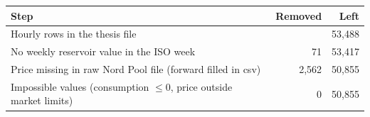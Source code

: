 \begin{tabular}{lrr}
\toprule
Step & Removed & Left \\
\midrule
Hourly rows in the thesis file &  & 53{,}488 \\
No weekly reservoir value in the ISO week & 71 & 53{,}417 \\
Price missing in raw Nord Pool file (forward filled in csv) & 2{,}562 & 50{,}855 \\
Impossible values (consumption $\le 0$, price outside market limits) & 0 & 50{,}855 \\
\bottomrule
\end{tabular}
